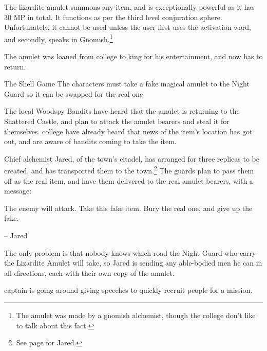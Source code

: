 \begin{multicols}{2}

\resumecontents[Villages]
\label{lizardite}
\stopcontents[Villages]

\startcontents[sq]

\sqminitoc

\noindent
The lizardite amulet summons any item, and is exceptionally powerful as it has 30 MP in total.  It functions as per the third level conjuration sphere.  Unfortunately, it cannot be used unless the user first uses the activation word, and secondly, speaks in Gnomish.\footnote{The amulet was made by a gnomish alchemist, though the college don't like to talk about this fact.}


The amulet was loaned from \gls{college} to \gls{king} for his entertainment, and now has to return.

{The Shell Game}%
{The characters must take a fake magical amulet to the Night Guard so it can be swapped for the real one}%

The local Woodspy Bandits have heard that the amulet is returning to the Shattered Castle, and plan to attack the amulet bearers and steal it for themselves.
\Gls{college} have already heard that news of the item's location has got out, and are aware of bandits coming to take the item.

Chief alchemist Jared, of the town's citadel, has arranged for three replicas to be created, and has transported them to the town.\footnote{See page \pageref{citadel_alchemist} for Jared.}
The guards plan to pass them off as the real item, and have them delivered to the real amulet bearers, with a message:

\begin{boxtext}

	The enemy will attack.
	Take this fake item.
	Bury the real one, and give up the fake.

	-- Jared

\end{boxtext}

The only problem is that nobody knows which road the Night Guard who carry the Lizardite Amulet will take, so Jared is sending any able-bodied men he can in all directions, each with their own copy of the amulet.

\Gls{captain} is going around giving speeches to quickly recruit people for a mission.


\end{multicols}
